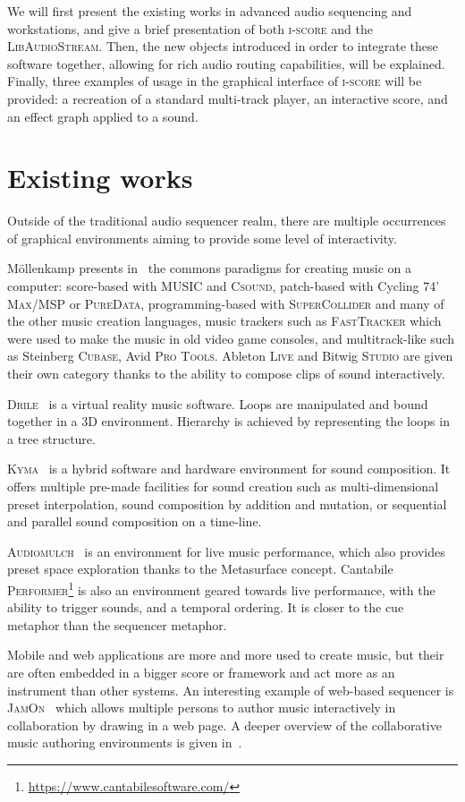 \documentclass{article}
\newcommand*{\LibAudioStream}{\textsc{LibAudioStream}\xspace}
\newcommand*{\iscore}{\textsc{i-score}\xspace}
\newcommand*{\maxmsp}{Cycling 74' \textsc{Max/MSP}\xspace}
\newcommand*{\puredata}{\textsc{PureData}\xspace}
\newcommand*{\csound}{\textsc{Csound}\xspace}
\newcommand*{\supercollider}{\textsc{SuperCollider}\xspace}
\newcommand*{\abletonlive}{Ableton \textsc{Live}\xspace}
\newcommand*{\bitwigstudio}{Bitwig \textsc{Studio}\xspace}
\newcommand*{\fasttracker}{\textsc{FastTracker}\xspace}
\newcommand*{\cubase}{Steinberg \textsc{Cubase}\xspace}
\newcommand*{\protools}{Avid \textsc{Pro Tools}\xspace}
\newcommand*{\MUSIC}{\textsc{MUSIC}\xspace}
\newcommand*{\drile}{\textsc{Drile}\xspace}
\newcommand*{\jamon}{\textsc{JamOn}\xspace}
\newcommand*{\kyma}{\textsc{Kyma}\xspace}
\newcommand*{\audiomulch}{\textsc{Audiomulch}\xspace}
\newcommand*{\cantabileperformer}{Cantabile \textsc{Performer}\xspace}
\begin{document}
We will first present the existing works in advanced audio sequencing and workstations, 
and give a brief presentation of both \iscore and the \LibAudioStream.
Then, the new objects introduced in order to integrate these software together, allowing 
for rich audio routing capabilities, will be explained.
Finally, three examples of usage in the graphical interface of \iscore will be provided: a recreation of a standard multi-track player, an interactive score, and an effect graph applied to a sound.

\section{Existing works}
Outside of the traditional audio sequencer realm, there are
multiple occurrences of graphical environments aiming to provide 
some level of interactivity.

M{\"o}llenkamp presents in~\cite{mollenkampparadigms} the 
commons paradigms for creating music on a computer: score-based with \MUSIC and \csound, 
patch-based with \maxmsp or \puredata, programming-based with \supercollider and many of the other music creation languages, music trackers such as \fasttracker which were used to make the music in old video game consoles, and multitrack-like such as \cubase, \protools.
\abletonlive and \bitwigstudio are given their own category thanks to the ability to compose clips of sound interactively.

\drile~\cite{berthaut2010drile} is a virtual reality music software. 
Loops are manipulated and bound together in a 3D environment. 
Hierarchy is achieved by representing the loops in a tree structure.

\kyma~\cite{scaletti1989kyma} is a hybrid software and hardware environment for sound composition. 
It offers multiple pre-made facilities for sound creation such as multi-dimensional preset interpolation, sound composition by addition and mutation, or sequential and parallel sound composition on a time-line.

\audiomulch~\cite{bencina2005metasurface} is an environment for live music performance, which also provides preset space exploration thanks to the Metasurface concept. 
\cantabileperformer\footnote{\url{https://www.cantabilesoftware.com/}} is also an environment geared towards live performance, with the ability to trigger sounds, and a temporal ordering. It is closer to the cue metaphor than the sequencer metaphor.

Mobile and web applications are more and more used to create music, 
but their are often embedded in a bigger score or framework and act more as an instrument than other systems.
An interesting example of web-based sequencer is \jamon~\cite{rosselet2013jam} which allows multiple persons to author music interactively in collaboration by drawing in a web page.
A deeper overview of the collaborative music authoring environments is given in~\cite{fencott2013computer}.
\end{document}
